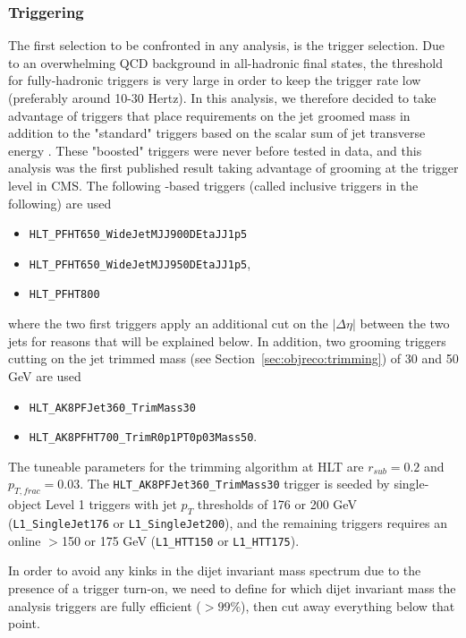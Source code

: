 \subsubsection{Triggering}
\label{sec:search1:trigger}
The first selection to be confronted in any analysis, is the trigger selection. Due to an overwhelming QCD background in all-hadronic final states, the threshold for fully-hadronic triggers is very large in order to keep the trigger rate low (preferably around 10-30 Hertz). In this analysis, we therefore decided to take advantage of triggers that place requirements on the jet groomed mass in addition to the "standard" triggers based on the scalar sum of jet transverse energy \HT. These "boosted" triggers were never before tested in data, and this analysis was the first published result taking advantage of grooming at the trigger level in CMS. The following \HT-based triggers (called inclusive triggers in the following) are used
\begin{itemize}
\item \texttt{HLT\_PFHT650\_WideJetMJJ900DEtaJJ1p5}
\item \texttt{HLT\_PFHT650\_WideJetMJJ950DEtaJJ1p5},
\item \texttt{HLT\_PFHT800}
\end{itemize}
where the two first triggers apply an additional cut on the $|\Delta \eta|$ between the two jets for reasons that will be explained below. In addition, two grooming triggers cutting on the jet trimmed mass (see Section~\ref{sec:objreco:trimming}) of 30 and 50 GeV are used
\begin{itemize}
\item \texttt{HLT\_AK8PFJet360\_TrimMass30}
\item \texttt{HLT\_AK8PFHT700\_TrimR0p1PT0p03Mass50}.
\end{itemize}
The tuneable parameters for the trimming algorithm at HLT are $r_{sub}=0.2$ and $p_{T,frac}=0.03$. The \texttt{HLT\_AK8PFJet360\_TrimMass30} trigger is seeded by single-object Level 1 triggers with jet $p_T$ thresholds of 176 or 200 GeV (\texttt{L1\_SingleJet176} or \texttt{L1\_SingleJet200}), and the remaining triggers requires an online \HT{}$>$150 or 175 GeV (\texttt{L1\_HTT150} or \texttt{L1\_HTT175}).\par

In order to avoid any kinks in the dijet invariant mass spectrum due to the presence of a trigger turn-on, we need to define for which dijet invariant mass the analysis triggers are fully efficient ($>99\%$), then cut away everything below that point.

